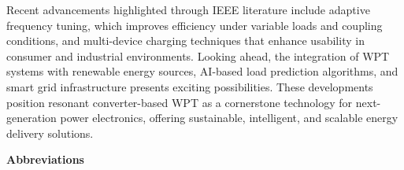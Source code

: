 \documentclass[12pt,a4paper]{report}
\begin{document}
\noindent
\hspace{2em}Recent advancements highlighted through IEEE literature include adaptive frequency tuning, which improves efficiency under variable loads and coupling conditions, and multi-device charging techniques that enhance usability in consumer and industrial environments. Looking ahead, the integration of WPT systems with renewable energy sources, AI-based load prediction algorithms, and smart grid infrastructure presents exciting possibilities. These developments position resonant converter-based WPT as a cornerstone technology for next-generation power electronics, offering sustainable, intelligent, and scalable energy delivery solutions.











\newpage
\vspace*{-6cm} %




\begin{center}
\vspace*{2cm} %
\tableofcontents
\end{center}

\clearpage

\begin{center}
\vspace*{-2cm}
\listoffigures
\end{center}

\clearpage

\begin{center}
\vspace*{-2cm}
\listoftables
\end{center}



\newpage



\begin{center}

 \huge \textbf{Abbreviations}

 \end{center}
\end{document}
